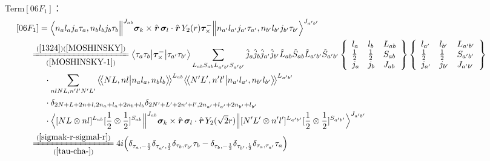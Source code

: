 \documentclass[master]{shnuthesis}
\newcommand{\llangle}{\big\langle\!\big\langle}
\newcommand{\rrangle}{\big\rangle\!\big\rangle}
\newcommand{\bmr}{\textbf{\textit{r}}}
\newcommand{\ap}{a^\prime}
\newcommand{\bp}{b^\prime}
\newcommand{\il}{\!\!\!\!\!\!\!\!\!\!}
\newcommand{\ii}{\!\!\!\!\!\!\!\!\!\!\!\!\!\!\!\!\!\!\!\!}
\newcommand{\zdydh}{\xlongequal}
\begin{document}
\,\\
{\color{red}Term$[06F_1]$：}
\begin{align}
    &\ii [06F_1] = \Big\langle n_a l_a j_a \tau_a, n_b l_b j_b \tau_b \Big\|^{J_{ab}} \bm{\sigma}_k \times \hat{\bmr}\, \bm{\sigma}_l \cdot \hat{\bmr}\, Y_2(r) \bm{\tau}_\times^- \Big\| n_{\ap} l_{\ap} j_{\ap} \tau_{\ap}, n_{\bp} l_{\bp} j_{\bp} \tau_{\bp} \Big\rangle^{J_{\ap \bp}} \\
    &\il \zdydh[(\ref{MOSHINSKY-1})]{(\ref{1324})(\ref{MOSHINSKY})} \big\langle \tau_a\tau_b \big|\bm{\tau}_\times^- \big|\tau_{\ap}\tau_{\bp}\big\rangle \sum_{L_{ab}S_{ab}L_{\ap\bp}S_{\ap\bp}} \hat{j}_a\hat{j}_b\hat{j}_{\ap}\hat{j}_{\bp}\hat{L}_{ab}\hat{S}_{ab}\hat{L}_{\ap\bp}\hat{S}_{\ap\bp}  \left\{\begin{array}{lll}l_{a} & l_{b} & L_{ab} \\ \frac{1}{2} & \frac{1}{2} & S_{ab} \\j_{a} & j_{b} & J_{ab} \end{array}\right\} \left\{\begin{array}{lll}l_{\ap} & l_{\bp} & L_{\ap\bp} \\ \frac{1}{2} & \frac{1}{2} & S_{\ap\bp} \\j_{\ap} & j_{\bp} & J_{\ap\bp} \end{array}\right\}  \notag \\
    & \cdot \sum_{nlNL,n^\prime l^\prime N^\prime L^\prime} \llangle N L, n l \big| n_{a} l_{a}, n_{b} l_{b} \rrangle^{L_{ab}} \llangle N^\prime L^\prime, n^\prime l^\prime \big| n_{a^\prime} l_{a^\prime}, n_{b^\prime} l_{b^\prime} \rrangle^{L_{\ap\bp}} \notag\\
    & \cdot \delta_{2N+L+2n+l,2n_a+l_a+2n_b+l_b}\delta_{2N^\prime+L^\prime+2n^\prime+l^\prime,2n_{a^\prime}+l_{a^\prime}+2n_{b^\prime}+l_{b^\prime}}  \notag\\
    & \cdot \Big\langle [N L \otimes n l]^{L_{ab}} [\frac{1}{2}\otimes\frac{1}{2}]^{S_{ab}} \Big\|^{J_{ab}} \bm{\sigma}_k \times \hat{\bmr}\, \bm{\sigma}_l \cdot \hat{\bmr}\, Y_2(\sqrt{2}r) \Big\| [N^\prime L^\prime \otimes n^\prime l^\prime]^{L_{\ap\bp}} [\frac{1}{2}\otimes\frac{1}{2}]^{S_{\ap\bp}} \Big\rangle^{J_{\ap \bp}} \\
    &\il \zdydh[(\ref{tau-cha-})]{(\ref{sigmak-r-sigmal-r})} 4i \Big( \delta_{\tau_a,-\frac{1}{2}}\delta_{\tau_{\ap},\frac{1}{2}}\delta_{\tau_b,\tau_{\bp}}\tau_b - \delta_{\tau_b,-\frac{1}{2}}\delta_{\tau_{\bp},\frac{1}{2}}\delta_{\tau_a,\tau_{\ap}}\tau_a \Big) \notag\\

\end{align}
\end{document}
